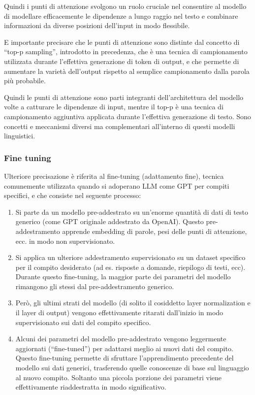             Quindi i punti di attenzione svolgono un ruolo cruciale nel consentire al modello di modellare efficacemente le dipendenze a lungo raggio nel testo e combinare informazioni da diverse posizioni dell'input in modo flessibile.
            
            E importante precisare che le punti di attenzione sono distinte dal concetto di ``top-p sampling'', introdotto in precedenza, che è una tecnica di campionamento utilizzata durante l'effettiva generazione di token di output, e che permette di aumentare la varietà dell'output rispetto al semplice campionamento dalla parola più probabile.
            
            Quindi le punti di attenzione sono parti integranti dell'architettura del modello volte a catturare le dipendenze di input, mentre il top-p è una tecnica di campionamento aggiuntiva applicata durante l'effettiva generazione di testo. Sono concetti e meccanismi diversi ma complementari all'interno di questi modelli linguistici.
            
        \subsubsection{Fine tuning}
            Ulteriore precisazione è riferita al fine-tuning (adattamento fine), tecnica comunemente utilizzata quando si adoperano LLM come GPT per compiti specifici, e che consiste nel seguente processo:
            \begin{enumerate}
                \item Si parte da un modello pre-addestrato su un'enorme quantità di dati di testo generico (come GPT originale addestrato da OpenAI). Questo pre-addestramento apprende embedding di parole, pesi delle punti di attenzione, ecc. in modo non supervisionato.

                \item Si applica un ulteriore addestramento supervisionato su un dataset specifico per il compito desiderato (ad es. risposte a domande, riepilogo di testi, ecc). Durante questo fine-tuning, la maggior parte dei parametri del modello rimangono gli stessi dal pre-addestramento generico.

                \item Però, gli ultimi strati del modello (di solito il cosiddetto layer normalization e il layer di output) vengono effettivamente ritarati dall'inizio in modo supervisionato sui dati del compito specifico.

                \item Alcuni dei parametri del modello pre-addestrato vengono leggermente aggiornati (``fine-tuned'') per adattarsi meglio ai nuovi dati del compito. Questo fine-tuning permette di sfruttare l'apprendimento precedente del modello sui dati generici, trasferendo quelle conoscenze di base sul linguaggio al nuovo compito. Soltanto una piccola porzione dei parametri viene effettivamente riaddestratta in modo significativo.
            \end{enumerate}
            
